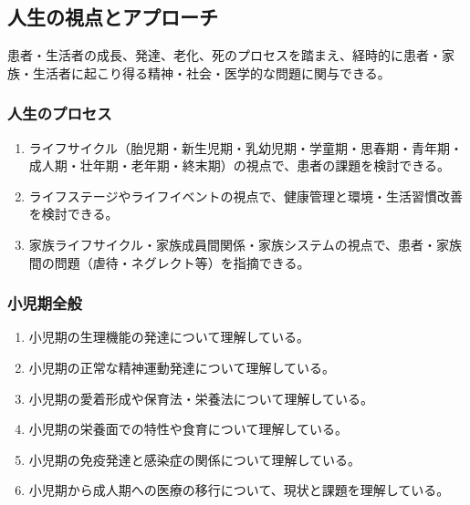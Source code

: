 \hypertarget{ux4ebaux751fux306eux8996ux70b9ux3068ux30a2ux30d7ux30edux30fcux30c1}{%
\subsection{人生の視点とアプローチ}\label{ux4ebaux751fux306eux8996ux70b9ux3068ux30a2ux30d7ux30edux30fcux30c1}}

患者・生活者の成長、発達、老化、死のプロセスを踏まえ、経時的に患者・家族・生活者に起こり得る精神・社会・医学的な問題に関与できる。

\hypertarget{ux4ebaux751fux306eux30d7ux30edux30bbux30b9}{%
\subsubsection{人生のプロセス}\label{ux4ebaux751fux306eux30d7ux30edux30bbux30b9}}

\begin{enumerate}
\def\labelenumi{\arabic{enumi}.}
\tightlist
\item
  ライフサイクル（胎児期・新生児期・乳幼児期・学童期・思春期・青年期・成人期・壮年期・老年期・終末期）の視点で、患者の課題を検討できる。
\item
  ライフステージやライフイベントの視点で、健康管理と環境・生活習慣改善を検討できる。
\item
  家族ライフサイクル・家族成員間関係・家族システムの視点で、患者・家族間の問題（虐待・ネグレクト等）を指摘できる。
\end{enumerate}

\hypertarget{ux5c0fux5150ux671fux5168ux822c}{%
\subsubsection{小児期全般}\label{ux5c0fux5150ux671fux5168ux822c}}

\begin{enumerate}
\def\labelenumi{\arabic{enumi}.}
\tightlist
\item
  小児期の生理機能の発達について理解している。
\item
  小児期の正常な精神運動発達について理解している。
\item
  小児期の愛着形成や保育法・栄養法について理解している。
\item
  小児期の栄養面での特性や食育について理解している。
\item
  小児期の免疫発達と感染症の関係について理解している。
\item
  小児期から成人期への医療の移行について、現状と課題を理解している。
\end{enumerate}


